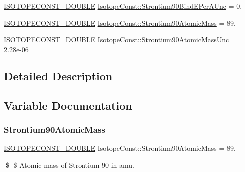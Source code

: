\begin{DoxyCompactItemize}
\mbox{\hyperlink{group___isotope_const-_macros_ga8f45a7272ce02c0b4c65c44636ed719a}{I\+S\+O\+T\+O\+P\+E\+C\+O\+N\+S\+T\+\_\+\+D\+O\+U\+B\+LE}} \mbox{\hyperlink{group___isotope_const-_strontium-_sr90_ga777af5895001fce7438d23b44cf07622}{Isotope\+Const\+::\+Strontium90\+Bind\+E\+Per\+A\+Unc}} = 0.
\item 
\mbox{\hyperlink{group___isotope_const-_macros_ga8f45a7272ce02c0b4c65c44636ed719a}{I\+S\+O\+T\+O\+P\+E\+C\+O\+N\+S\+T\+\_\+\+D\+O\+U\+B\+LE}} \mbox{\hyperlink{group___isotope_const-_strontium-_sr90_ga0e218e107a2a0f2c8973f04e3c3dd2c0}{Isotope\+Const\+::\+Strontium90\+Atomic\+Mass}} = 89.
\item 
\mbox{\hyperlink{group___isotope_const-_macros_ga8f45a7272ce02c0b4c65c44636ed719a}{I\+S\+O\+T\+O\+P\+E\+C\+O\+N\+S\+T\+\_\+\+D\+O\+U\+B\+LE}} \mbox{\hyperlink{group___isotope_const-_strontium-_sr90_ga4f04714bdcf10502b00672f2cbbb82bd}{Isotope\+Const\+::\+Strontium90\+Atomic\+Mass\+Unc}} = 2.\+28e-\/06
\end{DoxyCompactItemize}


\subsection{Detailed Description}


\subsection{Variable Documentation}
\mbox{\label{group___isotope_const-_strontium-_sr90_ga0e218e107a2a0f2c8973f04e3c3dd2c0}} 
\subsubsection{\texorpdfstring{Strontium90\+Atomic\+Mass}{Strontium90AtomicMass}}
{\footnotesize\ttfamily \mbox{\hyperlink{group___isotope_const-_macros_ga8f45a7272ce02c0b4c65c44636ed719a}{I\+S\+O\+T\+O\+P\+E\+C\+O\+N\+S\+T\+\_\+\+D\+O\+U\+B\+LE}} Isotope\+Const\+::\+Strontium90\+Atomic\+Mass = 89.}

\$ \$ Atomic mass of Strontium-\/90 in amu. \mbox{\label{group___isotope_const-_strontium-_sr90_ga4f04714bdcf10502b00672f2cbbb82bd}} 
